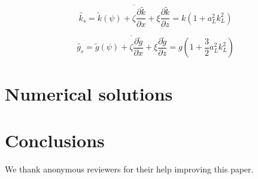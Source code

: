 \documentclass[draft]{agujournal2019}
\begin{document}
\begin{equation}
\label{eq:stokes_wavenumber}
\widetilde{k_s} = \overline{
  \widetilde{k}(\psi) +
  \zeta \dfrac{\partial \widetilde{k}}{\partial x} +
  \xi \dfrac{\partial \widetilde{k}}{\partial z}
}
= k \left( 1 + a_L^2 k_L^2 \right)
\end{equation}

\begin{equation}
\label{eq:stokes_gravity}
\widetilde{g_s} = \overline{
  \widetilde{g}(\psi) +
  \zeta \dfrac{\partial \widetilde{g}}{\partial x} +
  \xi \dfrac{\partial \widetilde{g}}{\partial z}
}
= g \left( 1 + \dfrac{3}{2} a_L^2 k_L^2 \right)
\end{equation}

\section{Numerical solutions}

\section{Conclusions}

\acknowledgments
We thank anonymous reviewers for their help improving this paper.


\end{document}
